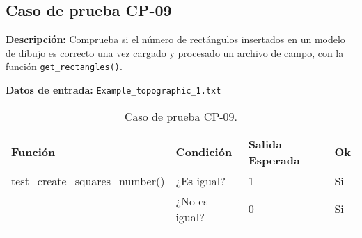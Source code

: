\subsection{Caso de prueba CP-09}

\textbf{Descripción:} Comprueba si el número de rectángulos insertados en un modelo de dibujo es correcto una vez cargado y procesado un archivo de campo, con la función \texttt{get\_rectangles()}.

\textbf{Datos de entrada:} \texttt{Example\_topographic\_1.txt}


\begin{longtable}[]{@{}llll@{}}
\toprule
\begin{minipage}[b]{0.6\columnwidth}\raggedright\strut
Función\strut
\end{minipage} & \begin{minipage}[b]{0.20\columnwidth}\raggedright\strut
Condición\strut
\end{minipage} & \begin{minipage}[b]{0.15\columnwidth}\raggedright\strut
Salida Esperada\strut
\end{minipage} & \begin{minipage}[b]{0.05\columnwidth}\raggedright\strut
Ok\strut
\end{minipage}\tabularnewline
\midrule
\endhead
\begin{minipage}[t]{0.6\columnwidth}\raggedright\strut
test\_create\_squares\_number()\strut
\end{minipage} & \begin{minipage}[t]{0.20\columnwidth}\raggedright\strut
¿Es igual?\strut
\end{minipage} & \begin{minipage}[t]{0.15\columnwidth}\raggedright\strut
1\strut
\end{minipage} & \begin{minipage}[t]{0.05\columnwidth}\raggedright\strut
Si\strut
\end{minipage}\tabularnewline
\begin{minipage}[t]{0.6\columnwidth}\raggedright\strut
\strut
\end{minipage} & \begin{minipage}[t]{0.20\columnwidth}\raggedright\strut
¿No es igual?\strut
\end{minipage} & \begin{minipage}[t]{0.15\columnwidth}\raggedright\strut
0\strut
\end{minipage} & \begin{minipage}[t]{0.05\columnwidth}\raggedright\strut
Si\strut
\end{minipage}\tabularnewline

\bottomrule
\caption{Caso de prueba CP-09.}
\end{longtable}

